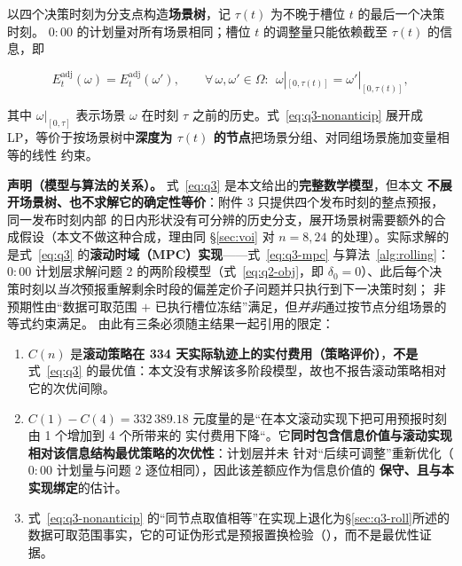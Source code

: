 以四个决策时刻为分支点构造\textbf{场景树}，记 \(\tau(t)\) 为不晚于槽位 \(t\) 的最后一个决策时刻。
\(0{:}00\) 的计划量对所有场景相同；槽位 \(t\) 的调整量只能依赖截至 \(\tau(t)\) 的信息，即

\begin{equation}
  E^{\text{adj}}_t(\omega)=E^{\text{adj}}_t(\omega'),
  \qquad
  \forall\,\omega,\omega'\in\Omega:\ \
  \omega|_{[0,\tau(t)]}=\omega'|_{[0,\tau(t)]},
  \label{eq:q3-nonanticip}
\end{equation}

其中 \(\omega|_{[0,\tau]}\) 表示场景 \(\omega\) 在时刻 \(\tau\) 之前的历史。式~\eqref{eq:q3-nonanticip}
展开成 LP，等价于按场景树中\textbf{深度为 \(\tau(t)\) 的节点}把场景分组、对同组场景施加变量相等的线性
约束。

\textbf{声明（模型与算法的关系）。} 式~\eqref{eq:q3} 是本文给出的\textbf{完整数学模型}，但本文
\textbf{不展开场景树、也不求解它的确定性等价}：附件 3 只提供四个发布时刻的整点预报，同一发布时刻内部
的日内形状没有可分辨的历史分支，展开场景树需要额外的合成假设（本文不做这种合成，理由同 \S\ref{sec:voi}
对 \(n=8,24\) 的处理）。实际求解的是式~\eqref{eq:q3} 的\textbf{滚动时域（MPC）实现}——式~\eqref{eq:q3-mpc}
与算法~\ref{alg:rolling}：\(0{:}00\) 计划层求解问题 2 的两阶段模型（式~\eqref{eq:q2-obj}，即
\(\delta_0=0\)）、此后每个决策时刻以\emph{当次}预报重解剩余时段的偏差定价子问题并只执行到下一决策时刻；
非预期性由“数据可取范围 \(+\) 已执行槽位冻结”满足，但\emph{并非}通过按节点分组场景的等式约束满足。
由此有三条必须随主结果一起引用的限定：

\begin{enumerate}[leftmargin=1.6em,itemsep=2pt,topsep=2pt]
  \item \(C(n)\) 是\textbf{滚动策略在 334 天实际轨迹上的实付费用（策略评价）}，\textbf{不是}式~\eqref{eq:q3}
        的最优值：本文没有求解该多阶段模型，故也不报告滚动策略相对它的次优间隙。
  \item \(C(1)-C(4)=332\,389.18\) 元度量的是“在本文滚动实现下把可用预报时刻由 1 个增加到 4 个所带来的
        实付费用下降“。它\textbf{同时包含信息价值与滚动实现相对该信息结构最优策略的次优性}：计划层并未
        针对“后续可调整”重新优化（\(0{:}00\) 计划量与问题 2 逐位相同），因此该差额应作为信息价值的
        \textbf{保守、且与本实现绑定}的估计。
  \item 式~\eqref{eq:q3-nonanticip} 的“同节点取值相等”在实现上退化为\S\ref{sec:q3-roll}所述的
        数据可取范围事实，它的可证伪形式是预报置换检验（），而不是最优性证据。
\end{enumerate}


